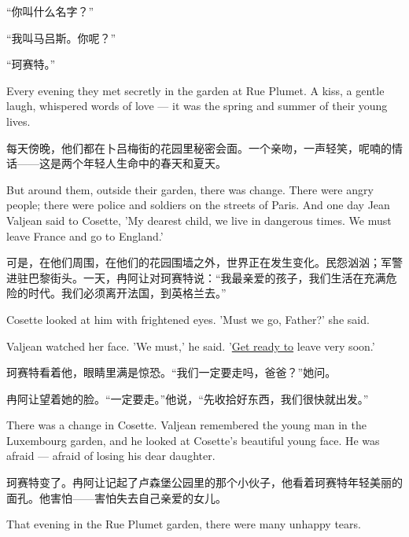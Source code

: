 \documentclass[fontset=ubuntu, zihao=5]{ctexart}
\begin{document}
\begin{paracol}{2}
“你叫什么名字？”

“我叫马吕斯。你呢？”

“珂赛特。”


\switchcolumn*

\sectionbreak

Every evening they met secretly in the garden at Rue Plumet. A kiss, a gentle laugh, whispered words of love --- it was the spring and summer of their young lives.

\switchcolumn

\sectionbreak

每天傍晚，他们都在卜吕梅街的花园里秘密会面。一个亲吻，一声轻笑，呢喃的情话——这是两个年轻人生命中的春天和夏天。

\switchcolumn*

But around them, outside their garden, there was change. There were angry people; there were police and soldiers on the streets of Paris. And one day Jean Valjean said to Cosette, 'My dearest child, we live in dangerous times. We must leave France and go to England.'

\switchcolumn

可是，在他们周围，在他们的花园围墙之外，世界正在发生变化。民怨汹汹；军警进驻巴黎街头。一天，冉阿让对珂赛特说：“我最亲爱的孩子，我们生活在充满危险的时代。我们必须离开法国，到英格兰去。”

\switchcolumn*

Cosette looked at him with frightened eyes. 'Must we go, Father?' she said.


Valjean watched her face. 'We must,' he said. '\uline{Get ready to} leave very soon.'

\switchcolumn

珂赛特看着他，眼睛里满是惊恐。“我们一定要走吗，爸爸？”她问。

冉阿让望着她的脸。“一定要走。”他说，“先收拾好东西，我们很快就出发。”

\switchcolumn*

There was a change in Cosette. Valjean remembered the young man in the Luxembourg garden, and he looked at Cosette's beautiful young face. He was afraid --- afraid of losing his dear daughter.

\switchcolumn

珂赛特变了。冉阿让记起了卢森堡公园里的那个小伙子，他看着珂赛特年轻美丽的面孔。他害怕——害怕失去自己亲爱的女儿。

\switchcolumn*

\sectionbreak

That evening in the Rue Plumet garden, there were many unhappy tears.


\end{paracol}
\end{document}
